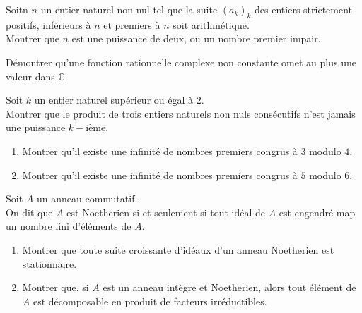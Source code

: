 \begin{exer}
Soitn $n$ un entier naturel non nul tel que la suite $(a_k)_k$ des entiers strictement positifs, %
inférieurs à $n$ et premiers à $n$ soit arithmétique.\\
Montrer que $n$ est une puissance de deux, ou un nombre premier impair.
\end{exer}

\begin{exer}
Démontrer qu'une fonction rationnelle complexe non constante omet au plus une valeur dans $\mathbb{C}$.
\end{exer}

\begin{exer}
Soit $k$ un entier naturel supérieur ou égal à $2$.\\
Montrer que le produit de trois entiers naturels non nuls consécutifs n'est jamais une puissance $k-$ième.
\end{exer}

\begin{exer}
\begin{enumerate}
\item Montrer qu'il existe une infinité de nombres premiers congrus à $3$ modulo $4$.
\item Montrer qu'il existe une infinité de nombres premiers congrus à $5$ modulo $6$.
\end{enumerate}
\end{exer}

\begin{exer}
Soit $A$ un anneau commutatif.\\
On dit que $A$ est Noetherien si et seulement si tout idéal de $A$ est engendré map un nombre fini d'éléments de $A$.
\begin{enumerate}
\item Montrer que toute suite croissante d'idéaux d'un anneau Noetherien est stationnaire.
\item Montrer que, si $A$ est un anneau intègre et Noetherien, alors tout élément de $A$ est décomposable en produit de facteurs irréductibles.
\end{enumerate}
\end{exer}

